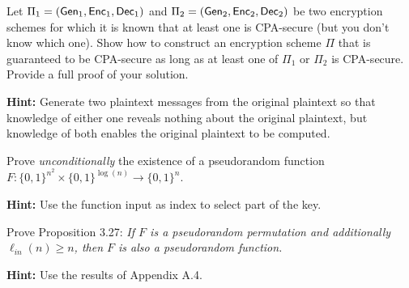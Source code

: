 \documentclass[a4paper,10pt,landscape,twocolumn]{scrartcl}
\begin{document}
\begin{exercise}
  Let $\Pi_1 = (\mathsf{Gen}_1,\mathsf{Enc}_1, \mathsf{Dec}_1)$ and $\Pi_2 = (\mathsf{Gen}_2,\mathsf{Enc}_2, \mathsf{Dec}_2)$ be two encryption schemes for which it is known that at least one is CPA-secure (but you don't know which one). Show how to construct an encryption scheme $\Pi$ that is guaranteed to be CPA-secure as long as at least one of $\Pi_1$ or $\Pi_2$ is CPA-secure. Provide a full proof of your solution.

  \textbf{Hint:} Generate two plaintext messages from the original plaintext so that knowledge of either one reveals nothing about the original plaintext, but knowledge of both enables the original plaintext to be computed.
\end{exercise}





\begin{bonusexercise}
  Prove \emph{unconditionally} the existence of a pseudorandom function $F : \{0,1\}^{n^2} \times \{0,1\}^{\log(n)} \to \{0,1\}^n$.

  \textbf{Hint:} Use the function input as index to select part of the key.
\end{bonusexercise}

\begin{bonusexercise}
  Prove Proposition 3.27:
  \textit{
If $F$ is a pseudorandom permutation and additionally $\ell_{in}(n) \geq n$, then $F$ is also a pseudorandom function.
  }

\textbf{Hint:} Use the results of Appendix A.4.
\end{bonusexercise}
\end{document}
